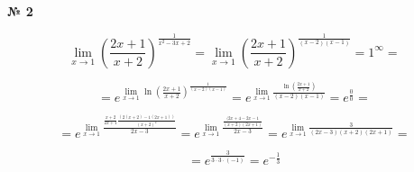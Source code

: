\documentclass{article}
\begin{document}
\textbf{№ 2} 

\begingroup
\Large

$$ \lim_{x\to 1} \left( \frac{2x+1}{x+2} \right)^{\frac{1}{x^2-3x+2}}
= \lim_{x\to 1} \left( \frac{2x+1}{x+2} \right)^{\frac{1}{(x-2)(x-1)}}
= 1^{\infty} 
= $$

$$ = e^{\lim\limits_{x\to 1} \ln{\left( \frac{2x+1}{x+2} \right)^{\frac{1}{(x-2)(x-1)}}}}
= e^{\lim\limits_{x\to 1} \frac{\ln{\left( \frac{2x+1}{x+2} \right)}}{(x-2)(x-1)}}
= e^{\frac{0}{0}}
= $$

$$ = e^{\lim\limits_{x\to 1} \frac{ \frac{x+2}{2x+1} \frac{(2(x+2) - 1(2x+1))}{(x+2)^2} }{2x-3} }
= e^{\lim\limits_{x\to 1} \frac{ \frac{(2x+4-2x-1}{(x+2)(2x+1)} }{2x-3} } 
= e^{\lim\limits_{x\to 1} \frac{3}{(2x-3)(x+2)(2x+1)}} 
= $$

$$ = e^{\frac{3}{3\cdot3\cdot(-1)}}
= e^{-\frac{1}{3}}$$

\endgroup
\end{document}
